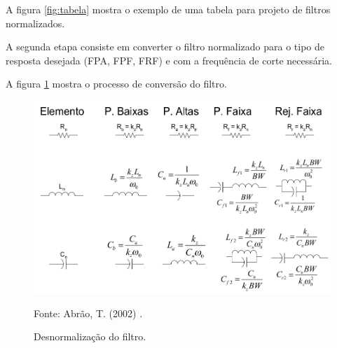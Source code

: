 A figura \ref{fig:tabela} mostra o exemplo de uma tabela para projeto de 
filtros normalizados. 

A segunda etapa consiste em converter o filtro normalizado para o tipo de 
resposta desejada (FPA, FPF, FRF) e com a frequência de corte necessária.

A figura \ref{fig:desnorm} mostra o processo de conversão do filtro.

\begin{figure}[!ht]
  \centering
  \caption{Desnormalização do filtro.}
  \includegraphics[scale=0.35]{Imagens/tabela2.png}
  
  \label{fig:desnorm}
  \small Fonte: Abrão, T. (2002) \cite{abrao}.
\end{figure}